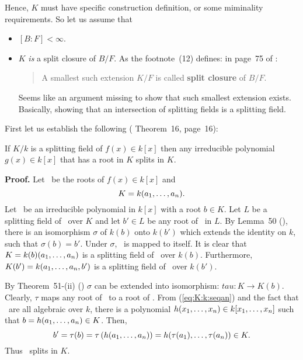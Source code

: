 \begin{myenumerate}
\begin{itemize}
   Hence, $K$ must have specific construction definition, or
   some miminality requirements. So let us assume
   that
   \begin{itemize}
    \item
      \([B:F]<\infty\).
    \item
      $K$ \emph{is} a
      {split closure} of \(B/F\). As the footnote~(12) defines:
      in page~75 of \cite{Rotman98}:
      \begin{quotation}
      A smallest such extension \(K/F\) is called \textbf{split closure}
      of \(B/F\).
      \end{quotation}
      Seems like an argument missing to show that
      such smallest extension exists.
      Basically, showing that an intersection of splitting fields is
      a splitting field.
   \end{itemize}

   First let us establish the following
   (\cite{McCarthy91} Theorem~16, page~16):
   \begin{llem} \label{lem:normal:ext}
   If \(K/k\) is a splitting field of \(f(x)\in k[x]\)
   then any irreducible polynomial \(g(x)\in k[x]\)
   that has a root in $K$ splits in $K$.
   \end{llem}
   \textbf{Proof.}
   Let \seqan\ be the roots of \(f(x)\in k[x]\) and
   \begin{equation} \label{eq:K:k:seqan}
   K=k(a_1,\ldots,a_{n}).
   \end{equation}
   Let \gx\ be an irreducible polynomial in \(k[x]\) with a root \(b\in K\).
   Let $L$ be a splitting field of \gx\ over $K$ and let \(b'\in L\)
   be any root of \gx\ in $L$.
   By Lemma~50 (\cite{Rotman98}), there is an isomorphism \(\sigma\)
   of \(k(b)\)
   onto \(k(b')\) which extends the identity on $k$, such that
   \(\sigma(b)=b'\). Under \(\sigma\), \fx\ is mapped to itself.
   It is clear that \(K=k(b)(a_1,\ldots,a_{n})\) is a splitting field
   of \fx\ over \(k(b)\). Furthermore, \(K(b')= k(a_1,\ldots,a_{n},b')\) is
   a splitting field of \fx\ over \(k(b')\).

   By Theorem~51-(ii) (\cite{Rotman98}) \(\sigma\) can be extended
   into isomorphism: \(tau: K \rightarrow K(b)\).
   Clearly, \(\tau\) maps any root of \fx\ to a root of \fx.
   From (\ref{eq:K:k:seqan}) and the fact that \seqan\ are all
   algebraic over $k$, there is a polynomial
    \(h(x_1,\ldots,x_{n})\in k[x_1,\ldots,x_{n}]\) such that \(b = h(a_1,\ldots,a_{n}) \in K\).
   Then,
   \begin{equation*}
   b' = \tau(b) = \tau\left(h(a_1,\ldots,a_{n})\right) =
        h(\tau(a_1),\ldots,\tau(a_n)) \in K.
   \end{equation*}
   Thus \gx\ splits in $K$.
   \proofend


\end{itemize}
\end{myenumerate}
